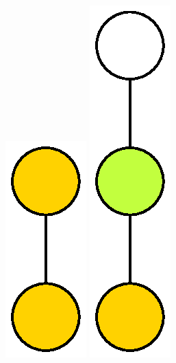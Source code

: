 \begin{figure}[H]

\centering
\hspace{5.5em}\includegraphics[scale=0.9]{Thesis/images/Coloured3_1LatticeGraph.eps}\hspace{5em}
\includegraphics[scale=0.6]{Thesis/images/Coloured28_3LatticeGraph.eps}\hspace{7em}

\end{figure}
